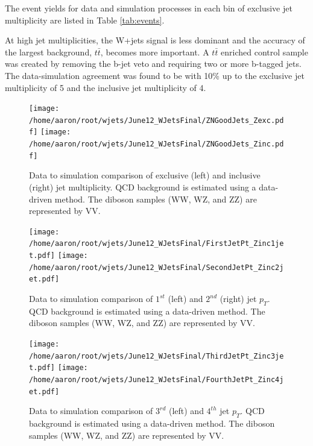\documentclass[oneside, letterpaper, oldfontcommands]{memoir}
\begin{document}
\qquad The event yields for data and simulation processes in each bin of exclusive jet multiplicity are listed in Table \ref{tab:events}.

\qquad At high jet multiplicities, the W+jets signal is less dominant and the accuracy of the largest background, $t\bar{t}$, becomes more important. A $t\bar{t}$ enriched control sample was created by removing the b-jet veto and requiring two or more b-tagged jets. The data-simulation agreement was found to be with 10\% up to the exclusive jet multiplicity of 5 and the inclusive jet multiplicity of 4. 

\begin{figure}[!Hhtbp]
\begin{center}
\texttt{[image: /home/aaron/root/wjets/June12\_WJetsFinal/ZNGoodJets\_Zexc.pdf]}
\texttt{[image: /home/aaron/root/wjets/June12\_WJetsFinal/ZNGoodJets\_Zinc.pdf]}
\end{center}
\caption{Data to simulation comparison of exclusive (left) and inclusive (right) jet multiplicity. QCD background is estimated using a data-driven method. The diboson samples (WW, WZ, and ZZ) are represented by VV.}
\label{mult}
\end{figure}

\begin{figure}[!Hhtbp]
\begin{center}
\texttt{[image: /home/aaron/root/wjets/June12\_WJetsFinal/FirstJetPt\_Zinc1jet.pdf]}
\texttt{[image: /home/aaron/root/wjets/June12\_WJetsFinal/SecondJetPt\_Zinc2jet.pdf]}\\
\end{center}
\caption{Data to simulation comparison of $1^{st}$ (left) and $2^{nd}$ (right) jet $p_{T}$. QCD background is estimated using a data-driven method. The diboson samples (WW, WZ, and ZZ) are represented by VV.}
\label{pt12}
\end{figure}

\begin{figure}[!Hhtbp]
\begin{center}
\texttt{[image: /home/aaron/root/wjets/June12\_WJetsFinal/ThirdJetPt\_Zinc3jet.pdf]}
\texttt{[image: /home/aaron/root/wjets/June12\_WJetsFinal/FourthJetPt\_Zinc4jet.pdf]}
\end{center}
\caption{Data to simulation comparison of $3^{rd}$ (left) and $4^{th}$ jet $p_{T}$. QCD background is estimated using a data-driven method. The diboson samples (WW, WZ, and ZZ) are represented by VV.}
\label{pt34}
\end{figure}
\end{document}
